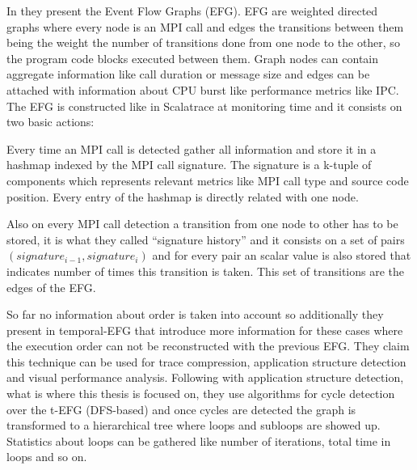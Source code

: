 In \cite{aguilar2014mpi} they present the Event Flow Graphs (EFG). EFG are
weighted directed graphs where every node is an MPI call and edges the
transitions between them being the weight the number of transitions done
from one node to the other, so the program code blocks executed between them.
Graph nodes can contain aggregate information like call duration or message size
and edges can be attached with information about CPU burst like performance
metrics like IPC. 
The EFG is constructed like in Scalatrace at monitoring time and it consists on
two basic actions: 
\begin{enumerate*}[label=\roman*)]
  \item Every time an MPI call is detected gather all information and store it
    in a hashmap indexed by the MPI call signature. The signature is a k-tuple
    of components which represents relevant metrics like MPI call type and
    source code position. Every entry of the hashmap is directly related with
    one node.
  \item Also on every MPI call detection a transition from one node to other has
    to be stored, it is what they called ``signature history'' and it consists
    on a set of pairs $(signature_{i-1}, signature_{i})$ and for every pair an
    scalar value is also stored that indicates number of times this transition
    is taken. This set of transitions are the edges of the EFG.
\end{enumerate*}

So far no information about order is taken into account
so additionally they present in \cite{aguilar2016event} temporal-EFG that 
introduce more
information for these cases where the execution order can not be reconstructed
with the previous EFG. They claim this technique can be used for trace
compression, application structure detection and visual performance analysis.
Following with application structure detection, what is where this thesis is
focused on, they use algorithms for cycle detection over the t-EFG (DFS-based)
and once cycles are detected the graph is transformed to a hierarchical tree
where loops and subloops are showed up. Statistics about loops can be gathered
like number of iterations, total time in loops and so on.


